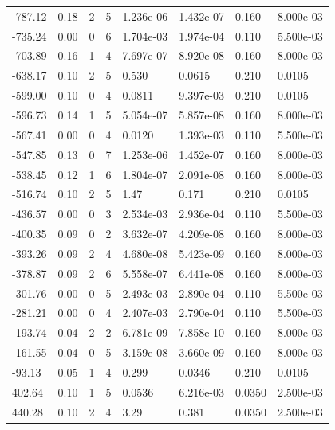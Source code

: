 \documentclass[preview]{standalone}
\begin{document}
{{\begin{tabular}{L{1.2cm}C{1.2cm} C{0.3cm}C{0.5cm} C{1.4cm}C{1.4cm} C{1.4cm}C{1.4cm}}
  -787.12  &  0.18  & 2     &  5 &  1.236e-06  & 1.432e-07  & 0.160 &  8.000e-03   \\ 
  -735.24  &  0.00  & 0     &  6 &  1.704e-03  & 1.974e-04  & 0.110 &  5.500e-03   \\ 
  -703.89  &  0.16  & 1     &  4 &  7.697e-07  & 8.920e-08  & 0.160 &  8.000e-03   \\ 
  -638.17  &  0.10  & 2     &  5 &  0.530  & 0.0615  & 0.210 &  0.0105   \\ 
  -599.00  &  0.10  & 0     &  4 &  0.0811  & 9.397e-03  & 0.210 &  0.0105   \\ 
  -596.73  &  0.14  & 1     &  5 &  5.054e-07  & 5.857e-08  & 0.160 &  8.000e-03   \\ 
  -567.41  &  0.00  & 0     &  4 &  0.0120  & 1.393e-03  & 0.110 &  5.500e-03   \\ 
  -547.85  &  0.13  & 0     &  7 &  1.253e-06  & 1.452e-07  & 0.160 &  8.000e-03   \\ 
  -538.45  &  0.12  & 1     &  6 &  1.804e-07  & 2.091e-08  & 0.160 &  8.000e-03   \\ 
  -516.74  &  0.10  & 2     &  5 &  1.47  & 0.171  & 0.210 &  0.0105   \\ 
  -436.57  &  0.00  & 0     &  3 &  2.534e-03  & 2.936e-04  & 0.110 &  5.500e-03   \\ 
  -400.35  &  0.09  & 0     &  2 &  3.632e-07  & 4.209e-08  & 0.160 &  8.000e-03   \\ 
  -393.26  &  0.09  & 2     &  4 &  4.680e-08  & 5.423e-09  & 0.160 &  8.000e-03   \\ 
  -378.87  &  0.09  & 2     &  6 &  5.558e-07  & 6.441e-08  & 0.160 &  8.000e-03   \\ 
  -301.76  &  0.00  & 0     &  5 &  2.493e-03  & 2.890e-04  & 0.110 &  5.500e-03   \\ 
  -281.21  &  0.00  & 0     &  4 &  2.407e-03  & 2.790e-04  & 0.110 &  5.500e-03   \\ 
  -193.74  &  0.04  & 2     &  2 &  6.781e-09  & 7.858e-10  & 0.160 &  8.000e-03   \\ 
  -161.55  &  0.04  & 0     &  5 &  3.159e-08  & 3.660e-09  & 0.160 &  8.000e-03   \\ 
  -93.13  &  0.05  & 1     &  4 &  0.299  & 0.0346  & 0.210 &  0.0105   \\ 
  402.64  &  0.10  & 1     &  5 &  0.0536  & 6.216e-03  & 0.0350 &  2.500e-03   \\ 
  440.28  &  0.10  & 2     &  4 &  3.29  & 0.381  & 0.0350 &  2.500e-03   \\ 

\end{tabular}}}
\end{document}
